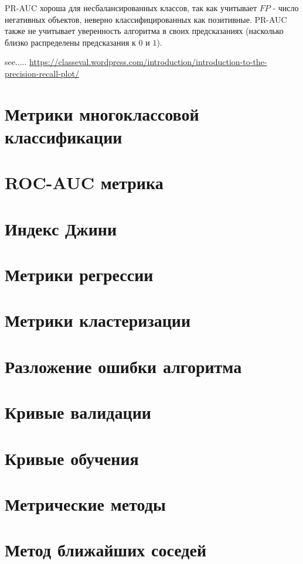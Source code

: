 PR-AUC хороша для несбалансированных классов, так как учитывает $FP$ - число негативных объектов, неверно классифицированных как позитивные. PR-AUC также не учитывает уверенность алгоритма в своих предсказаниях (насколько близко распределены предсказания к $0$ и $1$).

see.....
\url{https://classeval.wordpress.com/introduction/introduction-to-the-precision-recall-plot/}

\section{Метрики многоклассовой классификации}


\section{ROC-AUC метрика}


\section{Индекс Джини}


\section{Метрики регрессии}


\section{Метрики кластеризации}


\section{Разложение ошибки алгоритма}


\section{Кривые валидации}


\section{Кривые обучения}


\section{Метрические методы}


\section{Метод ближайших соседей}


